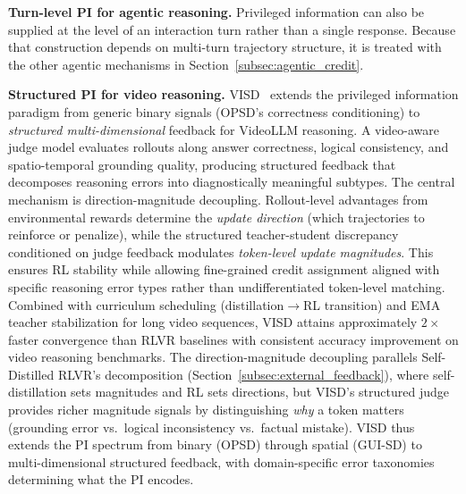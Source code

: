 \documentclass{article} %
\begin{document}
\textbf{Turn-level PI for agentic reasoning.} Privileged information can also be supplied at the level of an interaction turn rather than a single response. Because that construction depends on multi-turn trajectory structure, it is treated with the other agentic mechanisms in Section~\ref{subsec:agentic_credit}.

\textbf{Structured PI for video reasoning.} VISD~\citep{2605.06094} extends the privileged information paradigm from generic binary signals (OPSD's correctness conditioning) to \emph{structured multi-dimensional} feedback for VideoLLM reasoning. A video-aware judge model evaluates rollouts along answer correctness, logical consistency, and spatio-temporal grounding quality, producing structured feedback that decomposes reasoning errors into diagnostically meaningful subtypes. The central mechanism is direction-magnitude decoupling. Rollout-level advantages from environmental rewards determine the \emph{update direction} (which trajectories to reinforce or penalize), while the structured teacher-student discrepancy conditioned on judge feedback modulates \emph{token-level update magnitudes}. This ensures RL stability while allowing fine-grained credit assignment aligned with specific reasoning error types rather than undifferentiated token-level matching. Combined with curriculum scheduling (distillation$\to$RL transition) and EMA teacher stabilization for long video sequences, VISD attains approximately $2\times$ faster convergence than RLVR baselines with consistent accuracy improvement on video reasoning benchmarks. The direction-magnitude decoupling parallels Self-Distilled RLVR's decomposition (Section~\ref{subsec:external_feedback}), where self-distillation sets magnitudes and RL sets directions, but VISD's structured judge provides richer magnitude signals by distinguishing \emph{why} a token matters (grounding error vs.\ logical inconsistency vs.\ factual mistake). VISD thus extends the PI spectrum from binary (OPSD) through spatial (GUI-SD) to multi-dimensional structured feedback, with domain-specific error taxonomies determining what the PI encodes.
\end{document}
